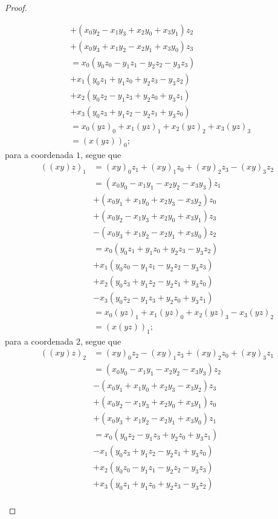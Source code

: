 \begin{proof}
\begin{itemize}
\begin{align*}
			&+ (x_0y_2 - x_1y_3 + x_2y_0 + x_3y_1)z_2 \\
			&+ (x_0y_3 + x_1y_2 - x_2y_1 + x_3y_0)z_3 \\
			&= x_0(y_0z_0 - y_1z_1 - y_2z_2 - y_3z_3) \\
			&+ x_1(y_0z_1 + y_1z_0 + y_2z_3 - y_3z_2) \\
			&+ x_2(y_0z_2 - y_1z_3 + y_2z_0 + y_3z_1) \\
			&+ x_3(y_0z_3 + y_1z_2 - y_2z_1 + y_3z_0) \\
			&= x_0(yz)_0 + x_1(yz)_1 + x_2(yz)_2 + x_3(yz)_3 \\
			&= (x(yz))_0;
		\end{align*}
	para a coordenada $1$, segue que
		\begin{align*}
		((xy)z)_1 &= (xy)_0z_1 + (xy)_1z_0 + (xy)_2z_3 - (xy)_3z_2 \\
			&= (x_0y_0 - x_1y_1 - x_2y_2 - x_3y_3)z_1 \\
			&+ (x_0y_1 + x_1y_0 + x_2y_3 - x_3y_2)z_0 \\
			&+ (x_0y_2 - x_1y_3 + x_2y_0 + x_3y_1)z_3 \\
			&- (x_0y_3 + x_1y_2 - x_2y_1 + x_3y_0)z_2 \\
			&= x_0(y_0z_1 + y_1z_0 + y_2z_3 - y_3z_2) \\
			&+ x_1(y_0z_0 - y_1z_1 - y_2z_2 - y_3z_3) \\
			&+ x_2(y_0z_3 + y_1z_2 - y_2z_1 + y_3z_0) \\
			&- x_3(y_0z_2 - y_1z_3 + y_2z_0 + y_3z_1) \\
			&= x_0(yz)_1 + x_1(yz)_0 + x_2(yz)_3 - x_3(yz)_2 \\
			&= (x(yz))_1;
		\end{align*}
	para a coordenada $2$, segue que
		\begin{align*}
		((xy)z)_2 &= (xy)_0z_2 - (xy)_1z_3 + (xy)_2z_0 + (xy)_3z_1 \\
			&= (x_0y_0 - x_1y_1 - x_2y_2 - x_3y_3)z_2 \\
			&- (x_0y_1 + x_1y_0 + x_2y_3 - x_3y_2)z_3 \\
			&+ (x_0y_2 - x_1y_3 + x_2y_0 + x_3y_1)z_0 \\
			&+ (x_0y_3 + x_1y_2 - x_2y_1 + x_3y_0)z_1 \\
			&= x_0(y_0z_2 - y_1z_3 + y_2z_0 + y_3z_1) \\
			&- x_1(y_0z_3 + y_1z_2 - y_2z_1 + y_3z_0) \\
			&+ x_2(y_0z_0 - y_1z_1 - y_2z_2 - y_3z_3) \\
			&+ x_3(y_0z_1 + y_1z_0 + y_2z_3 - y_3z_2) \\

\end{align*}
\end{itemize}
\end{proof}

